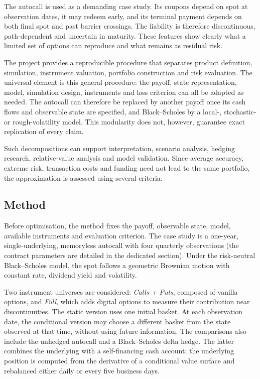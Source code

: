 \documentclass[12pt,a4paper]{article}
\newcommand{\1}{\mathbf{1}}
\begin{document}
The autocall is used as a demanding case study. Its coupons depend on spot at observation dates, it may redeem early, and its terminal payment depends on both final spot and past barrier crossings. The liability is therefore discontinuous, path-dependent and uncertain in maturity. These features show clearly what a limited set of options can reproduce and what remains as residual risk.

The project provides a reproducible procedure that separates product definition, simulation, instrument valuation, portfolio construction and risk evaluation. The universal element is this general procedure: the payoff, state representation, model, simulation design, instruments and loss criterion can all be adapted as needed. The autocall can therefore be replaced by another payoff once its cash flows and observable state are specified, and Black--Scholes by a local-, stochastic- or rough-volatility model. This modularity does not, however, guarantee exact replication of every claim.

Such decompositions can support interpretation, scenario analysis, hedging research, relative-value analysis and model validation. Since average accuracy, extreme risk, transaction costs and funding need not lead to the same portfolio, the approximation is assessed using several criteria.

\subsection*{Method}

Before optimisation, the method fixes the payoff, observable state, model, available instruments and evaluation criterion. The case study is a one-year, single-underlying, memoryless autocall with four quarterly observations (the contract parameters are detailed in the dedicated section). Under the risk-neutral Black--Scholes model, the spot follows a geometric Brownian motion with constant rate, dividend yield and volatility.

Two instrument universes are considered: \emph{Calls + Puts}, composed of vanilla options, and \emph{Full}, which adds digital options to measure their contribution near discontinuities. The static version uses one initial basket. At each observation date, the conditional version may choose a different basket from the state observed at that time, without using future information. The comparisons also include the unhedged autocall and a Black--Scholes delta hedge. The latter combines the underlying with a self-financing cash account; the underlying position is computed from the derivative of a conditional value surface and rebalanced either daily or every five business days.
\end{document}
